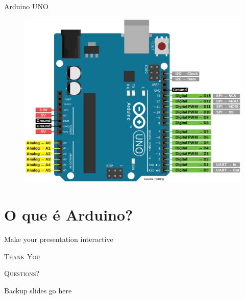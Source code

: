 \documentclass{cubeamer}
\begin{document}
\begin{frame}{Arduino UNO}


    \begin{figure}
        \centering
        \includegraphics[height = 0.7\textheight]{img/uno.png}
    \end{figure}


\end{frame}

\section{O que é Arduino?}

\begin{frame}{Make your presentation interactive}
    \begin{cublock}
        \begin{overlayarea}{\textwidth}{\baselineskip}
        \end{overlayarea}
    \end{cublock}
\end{frame}

\begin{frame}[standout]
    \Huge\textsc{Thank You}
    
    \vfill
    
    \LARGE\textsc{Questions?}
\end{frame}

\appendix

\begin{frame}{Backup slides go here}
    
\end{frame}
\end{document}
